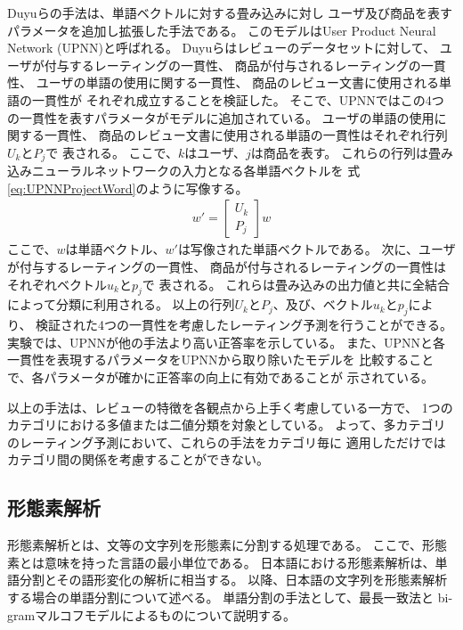 Duyuらの手法は、単語ベクトルに対する畳み込み\nn に対し
ユーザ及び商品を表すパラメータを追加し拡張した手法である。
このモデルはUser Product Neural Network (UPNN)と呼ばれる。
Duyuらはレビューのデータセットに対して、
ユーザが付与するレーティングの一貫性、
商品が付与されるレーティングの一貫性、
ユーザの単語の使用に関する一貫性、
商品のレビュー文書に使用される単語の一貫性が
それぞれ成立することを検証した。
そこで、UPNNではこの4つの一貫性を表すパラメータがモデルに追加されている。
ユーザの単語の使用に関する一貫性、
商品のレビュー文書に使用される単語の一貫性はそれぞれ行列$U_k$と$P_j$で
表される。
ここで、$k$はユーザ、$j$は商品を表す。
これらの行列は畳み込みニューラルネットワークの入力となる各単語ベクトルを
式\ref{eq:UPNNProjectWord}のように写像する。
\begin{gather} \label{eq:UPNNProjectWord}
  w' = \left[ \begin{array}{c} U_k \\ P_j \end{array} \right] w
\end{gather}
ここで、$w$は単語ベクトル、$w'$は写像された単語ベクトルである。
次に、ユーザが付与するレーティングの一貫性、
商品が付与されるレーティングの一貫性はそれぞれベクトル$u_k$と$p_j$で
表される。
これらは畳み込み\nn の出力値と共に全結合\nn によって分類に利用される。
以上の行列$U_k$と$P_j$、及び、ベクトル$u_k$と$p_j$により、
検証された4つの一貫性を考慮したレーティング予測を行うことができる。
実験では、UPNNが他の手法より高い正答率を示している。
また、UPNNと各一貫性を表現するパラメータをUPNNから取り除いたモデルを
比較することで、各パラメータが確かに正答率の向上に有効であることが
示されている。

以上の手法は、レビューの特徴を各観点から上手く考慮している一方で、
1つのカテゴリにおける多値または二値分類を対象としている。
よって、多カテゴリのレーティング予測において、これらの手法をカテゴリ毎に
適用しただけではカテゴリ間の関係を考慮することができない。


\subsection{形態素解析}

形態素解析とは、文等の文字列を形態素に分割する処理である\cite{hozumi06}。
ここで、形態素とは意味を持った言語の最小単位である。
日本語における形態素解析は、単語分割とその語形変化の解析に相当する。
以降、日本語の文字列を形態素解析する場合の単語分割について述べる。
単語分割の手法として、最長一致法と
bi-gramマルコフモデルによるものについて説明する。

